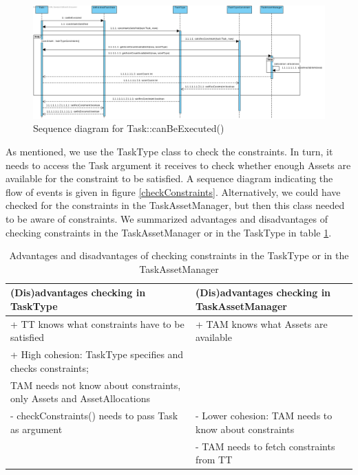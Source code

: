 			\begin{figure}
			\includegraphics[scale=0.3]{images/canBeExecuted.png}
			\caption{Sequence diagram for Task::canBeExecuted()}
						\label{canBeExecuted}
			\end{figure}
			
			As mentioned, we use the TaskType class to check the constraints. In turn, it needs to access the Task argument it receives to check whether enough Assets are available for the constraint to be satisfied. A sequence diagram indicating the flow of events is given in figure \ref{checkConstraints}. Alternatively, we could have checked for the constraints in the TaskAssetManager, but then this class needed to be aware of constraints. We summarized advantages and disadvantages of checking constraints in the TaskAssetManager or in the TaskType in table \ref{TaskType Tam}.
						
			\begin{table}
			\begin{tabular}{|p{7cm}|p{5cm}|}
				\hline
				(Dis)advantages checking in TaskType & (Dis)advantages checking in TaskAssetManager\\
				\hline
				
				+ TT knows what constraints have to be satisfied & + TAM knows what Assets are available\\
				+ High cohesion: TaskType specifies and checks constraints;&\\ 
					TAM needs not know about constraints, only Assets and AssetAllocations& \\
				\hline
				- checkConstraints() needs to pass Task as argument & - Lower cohesion: TAM needs to know about constraints\\
				& - TAM needs to fetch constraints from TT\\
				\hline
			\end{tabular}
			\caption{Advantages and disadvantages of checking constraints in the TaskType or in the TaskAssetManager}
						\label{TaskType Tam}
			\end{table}
			
